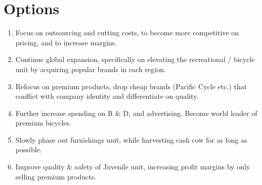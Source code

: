 \pagebreak
\chapter*{Options}


\begin{enumerate}
  \item Focus on outsourcing and cutting costs, to become more competitive on pricing, and to increase margins.
  \item Continue global expansion, specifically on elevating the recreational / bicycle unit by acquiring popular brands in each region.
  \item Refocus on premium products, drop cheap brands (Pacific Cycle etc.) that conflict with company identity and differentiate on quality.
  \item Further increase spending on R \& D, and advertising.  Become world leader of premium bicycles.
  \item Slowly phase out furnishings unit, while harvesting cash cow for as long as possible.
  \item Improve quality \& safety of Juvenile unit, increasing profit margins by only selling premium products.
\end{enumerate}






\endgroup			

\vfill

